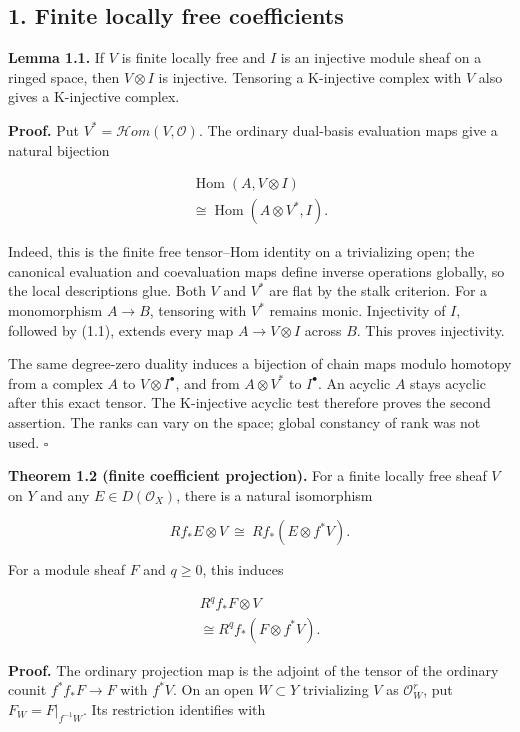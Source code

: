 \documentclass[
  english,
  11pt,
  a4paper,
]{article}
\begin{document}
\subsection{1. Finite locally free
coefficients}\label{projection-formula-and-base-change--1-finite-locally-free-coefficients}

\textbf{Lemma 1.1.} If \(V\) is finite locally free and \(I\) is an
injective module sheaf on a ringed space, then \(V\otimes I\) is
injective. Tensoring a K-injective complex with \(V\) also gives a
K-injective complex.

\textbf{Proof.} Put \(V^*=\mathcal Hom(V,\mathcal O)\). The ordinary
dual-basis evaluation maps give a natural bijection

\[\begin{gathered}
\operatorname{Hom}(A,V\otimes I)\\
\cong\operatorname{Hom}(A\otimes V^*,I).
\end{gathered}
\tag{1.1}\]

Indeed, this is the finite free tensor--Hom identity on a trivializing
open; the canonical evaluation and coevaluation maps define inverse
operations globally, so the local descriptions glue. Both \(V\) and
\(V^*\) are flat by the stalk criterion. For a monomorphism \(A\to B\),
tensoring with \(V^*\) remains monic. Injectivity of \(I\), followed by
(1.1), extends every map \(A\to V\otimes I\) across \(B\). This proves
injectivity.

The same degree-zero duality induces a bijection of chain maps modulo
homotopy from a complex \(A\) to \(V\otimes I^\bullet\), and from
\(A\otimes V^*\) to \(I^\bullet\). An acyclic \(A\) stays acyclic after
this exact tensor. The K-injective acyclic test therefore proves the
second assertion. The ranks can vary on the space; global constancy of
rank was not used. \(\square\)

\textbf{Theorem 1.2 (finite coefficient projection).} For a finite
locally free sheaf \(V\) on \(Y\) and any \(E\in D(\mathcal O_X)\),
there is a natural isomorphism

\[Rf_*E\otimes V\ \cong\ Rf_*(E\otimes f^*V).
\tag{1.2}\]

For a module sheaf \(F\) and \(q\ge0\), this induces

\[\begin{gathered}
R^qf_*F\otimes V\\
\cong R^qf_*(F\otimes f^*V).
\end{gathered}
\tag{1.3}\]

\textbf{Proof.} The ordinary projection map is the adjoint of the tensor
of the ordinary counit \(f^*f_*F\to F\) with \(f^*V\). On an open
\(W\subset Y\) trivializing \(V\) as \(\mathcal O_W^r\), put
\(F_W=F|_{f^{-1}W}\). Its restriction identifies with
\end{document}
